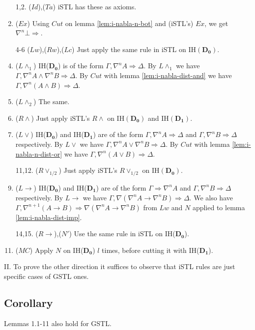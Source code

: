 \begin{enumerate}
	\item[1,2.] ($Id$),($Ta$) iSTL has these as axioms.
	\setcounter{enumi}{2}

	\item ($Ex$) Using $Cut$ on lemma \ref{lem:i-nabla-n-bot} and (iSTL's) $Ex$, we get $\nabla^n \bot \Rightarrow$.

	\item[4-6] ($Lw$),($Rw$),($Lc$) Just apply the same rule in iSTL on IH$(\mathbf{D_0})$.
	\setcounter{enumi}{6}

	\item ($L\land_1$) IH($\mathbf{D_0}$) is of the form $\Gamma , \nabla^n A \Rightarrow \Delta$. By $L\land_1$ we have $\Gamma , \nabla^n A \land \nabla^n B \Rightarrow \Delta$. By $Cut$ with lemma \ref{lem:i-nabla-dist-and} we have $\Gamma , \nabla^n (A \land B) \Rightarrow \Delta$.
	
	\item ($L\land_2$) The same.
	
	\item ($R\land$) Just apply iSTL's $R\land$ on IH$(\mathbf{D_0})$ and IH$(\mathbf{D_1})$.
	
	\item ($L\lor$) IH($\mathbf{D_0}$) and IH($\mathbf{D_1}$) are of the form $\Gamma , \nabla^n A \Rightarrow \Delta$ and $\Gamma , \nabla^n B \Rightarrow \Delta$ respectively. By $L\lor$ we have $\Gamma , \nabla^n A \lor \nabla^n B \Rightarrow \Delta$. By $Cut$ with lemma \ref{lem:i-nabla-n-dist-or} we have $\Gamma , \nabla^n (A \lor B) \Rightarrow \Delta$.
	
	\item[11,12.] ($R\lor_{1/2}$) Just apply iSTL's $R\lor_{1/2}$ on IH$(\mathbf{D_0})$.
	\setcounter{enumi}{12}
	
	\item ($L\rightarrow$) IH($\mathbf{D_0}$) and IH($\mathbf{D_1}$) are of the form $\Gamma \Rightarrow \nabla^n A$ and $\Gamma , \nabla^n B \Rightarrow \Delta$ respectively. By $L\rightarrow$ we have $\Gamma , \nabla (\nabla^n A \rightarrow \nabla^n B) \Rightarrow \Delta$. We also have $\Gamma , \nabla^{n+1} (A \rightarrow B) \Rightarrow \nabla (\nabla^n A \rightarrow \nabla^n B)$ from $Lw$ and $N$ applied to lemma \ref{lem:i-nabla-dist-imp}.
	
	\item[14,15.] ($R\rightarrow$),($N'$) Use the same rule in iSTL on IH($\mathbf{D_0}$).
	\setcounter{enumi}{15}
	
	\item ($MC$) Apply $N$ on IH($\mathbf{D_0}$) $l$ times, before cutting it with IH($\mathbf{D_1}$).
\end{enumerate}
II. To prove the other direction it suffices to observe that iSTL rules are just specific cases of GSTL ones.

\subsection{Corollary} Lemmas 1.1-11 also hold for GSTL.